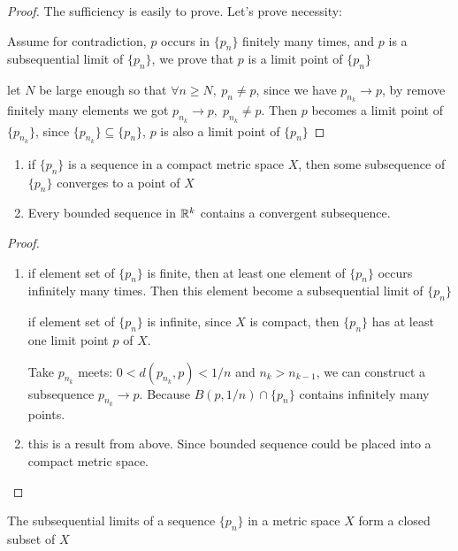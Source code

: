 \begin{proof}
    The sufficiency is easily to prove. Let's prove necessity:

    Assume for contradiction, $p$ occurs in $\{ p_n \}$ finitely many times, and $p$ is a subsequential limit of $\{ p_n\}$,
    we prove that $p$ is a limit point of $\{ p_n \}$

    let $N$ be large enough so that $\forall n \ge N,\: p_n \ne p$, since we have $p_{n_k} \to p$, by remove
    finitely many elements we got $p_{n_k} \to p,\; p_{n_k} \ne p$. Then $p$ becomes a limit point
    of $\{ p_{n_k}\}$, since $\{ p_{n_k}\} \subseteq \{ p_n \}$, $p$ is also a limit point of $\{ p_n\}$

\end{proof}

\begin{thm}
    \begin{enumerate}
        \item if $\{p_n\}$ is a sequence in a compact metric space $X$, then some subsequence of $\{ p_n\}$ converges to a point of $X$

        \item Every bounded sequence in $\mathbb{R}^k$ contains a convergent subsequence.
    \end{enumerate}
\end{thm}

\begin{proof}

    \begin{enumerate}
        \item if element set of $\{ p_n\}$ is finite, then at least one element of $\{ p_n \}$ occurs infinitely many times.
   Then this element become a subsequential limit of $\{ p_n \}$

   if element set of $\{ p_n \}$ is infinite, since $X$ is compact, then $\{ p_n \}$ has at least
   one limit point $p$ of $X$. 

   Take $p_{n_k}$ meets: $0 < d(p_{n_k}, p) < 1/n$ and $n_k > n_{k-1}$, we can construct a subsequence $p_{n_k} \to p$. 
   Because $B(p, 1/n) \cap \{ p_n \}$ contains infinitely many points.

        \item this is a result from above. Since bounded sequence could be placed into a compact metric space.
    \end{enumerate}
\end{proof}

\begin{thm}
    \label{thm:3-1-4}
    The subsequential limits of a sequence $\{p_n \}$ in a metric space  $X$
    form a closed subset of $X$
\end{thm}

